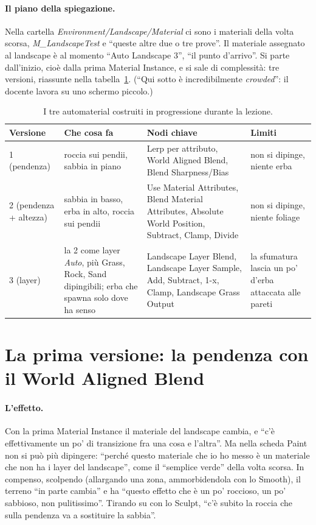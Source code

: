 \paragraph{Il piano della spiegazione.} Nella cartella \emph{Environment/Landscape/Material}
ci sono i materiali della volta scorsa, \emph{M\_LandscapeTest} e ``queste altre due o tre
prove''. Il materiale assegnato al landscape è al momento ``Auto Landscape 3'', ``il punto
d'arrivo''. Si parte dall'inizio, cioè dalla prima Material Instance, e si sale di
complessità: tre versioni, riassunte nella tabella~\ref{ue15:tab:automaterial}. (``Qui sotto
è incredibilmente \emph{crowded}'': il docente lavora su uno schermo piccolo.)

\begin{table}[htbp]
\centering
\small
\begin{tabular}{@{}p{2.2cm}p{4.6cm}p{3.6cm}p{3.6cm}@{}}
\toprule
\textbf{Versione} & \textbf{Che cosa fa} & \textbf{Nodi chiave} & \textbf{Limiti} \\
\midrule
1 (pendenza) & roccia sui pendii, sabbia in piano & Lerp per attributo, World Aligned
Blend, Blend Sharpness/Bias & non si dipinge, niente erba \\
2 (pendenza + altezza) & sabbia in basso, erba in alto, roccia sui pendii & Use Material
Attributes, Blend Material Attributes, Absolute World Position, Subtract, Clamp, Divide &
non si dipinge, niente foliage \\
3 (layer) & la 2 come layer \emph{Auto}, più Grass, Rock, Sand dipingibili; erba che spawna
solo dove ha senso & Landscape Layer Blend, Landscape Layer Sample, Add, Subtract, 1-x,
Clamp, Landscape Grass Output & la sfumatura lascia un po' d'erba attaccata alle pareti \\
\bottomrule
\end{tabular}
\caption{I tre automaterial costruiti in progressione durante la lezione.}
\label{ue15:tab:automaterial}
\end{table}

\section{La prima versione: la pendenza con il World Aligned Blend}
\label{ue15:sec:pendenza}

\paragraph{L'effetto.} Con la prima Material Instance il materiale del landscape cambia, e
``c'è effettivamente un po' di transizione fra una cosa e l'altra''. Ma nella scheda Paint
non si può più dipingere: ``perché questo materiale che io ho messo è un materiale che non
ha i layer del landscape'', come il ``semplice verde'' della volta scorsa. In compenso,
scolpendo (allargando una zona, ammorbidendola con lo Smooth), il terreno ``in parte
cambia'' e ha ``questo effetto che è un po' roccioso, un po' sabbioso, non pulitissimo''.
Tirando su con lo Sculpt, ``c'è subito la roccia che sulla pendenza va a sostituire la
sabbia''.

